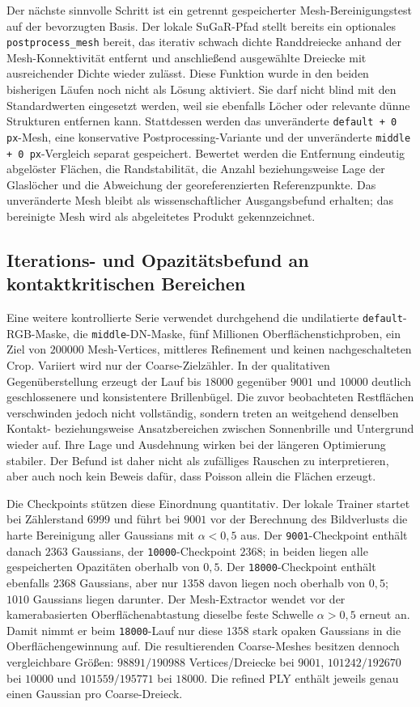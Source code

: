 \documentclass[12pt,a4paper]{article}
\begin{document}
Der nächste sinnvolle Schritt ist ein getrennt gespeicherter Mesh-Bereinigungstest auf der bevorzugten Basis. Der lokale SuGaR-Pfad stellt bereits ein optionales \texttt{postprocess\_mesh} bereit, das iterativ schwach dichte Randdreiecke anhand der Mesh-Konnektivität entfernt und anschließend ausgewählte Dreiecke mit ausreichender Dichte wieder zulässt. Diese Funktion wurde in den beiden bisherigen Läufen noch nicht als Lösung aktiviert. Sie darf nicht blind mit den Standardwerten eingesetzt werden, weil sie ebenfalls Löcher oder relevante dünne Strukturen entfernen kann. Stattdessen werden das unveränderte \texttt{default + 0\,px}-Mesh, eine konservative Postprocessing-Variante und der unveränderte \texttt{middle + 0\,px}-Vergleich separat gespeichert. Bewertet werden die Entfernung eindeutig abgelöster Flächen, die Randstabilität, die Anzahl beziehungsweise Lage der Glaslöcher und die Abweichung der georeferenzierten Referenzpunkte. Das unveränderte Mesh bleibt als wissenschaftlicher Ausgangsbefund erhalten; das bereinigte Mesh wird als abgeleitetes Produkt gekennzeichnet.

\subsection*{Iterations- und Opazitätsbefund an kontaktkritischen Bereichen}

Eine weitere kontrollierte Serie verwendet durchgehend die undilatierte \texttt{default}-RGB-Maske, die \texttt{middle}-DN-Maske, fünf Millionen Oberflächenstichproben, ein Ziel von $200000$ Mesh-Vertices, mittleres Refinement und keinen nachgeschalteten Crop. Variiert wird nur der Coarse-Zielzähler. In der qualitativen Gegenüberstellung erzeugt der Lauf bis $18000$ gegenüber $9001$ und $10000$ deutlich geschlossenere und konsistentere Brillenbügel. Die zuvor beobachteten Restflächen verschwinden jedoch nicht vollständig, sondern treten an weitgehend denselben Kontakt- beziehungsweise Ansatzbereichen zwischen Sonnenbrille und Untergrund wieder auf. Ihre Lage und Ausdehnung wirken bei der längeren Optimierung stabiler. Der Befund ist daher nicht als zufälliges Rauschen zu interpretieren, aber auch noch kein Beweis dafür, dass Poisson allein die Flächen erzeugt.

Die Checkpoints stützen diese Einordnung quantitativ. Der lokale Trainer startet bei Zählerstand $6999$ und führt bei $9001$ vor der Berechnung des Bildverlusts die harte Bereinigung aller Gaussians mit $\alpha<0{,}5$ aus. Der \texttt{9001}-Checkpoint enthält danach $2363$ Gaussians, der \texttt{10000}-Checkpoint $2368$; in beiden liegen alle gespeicherten Opazitäten oberhalb von $0{,}5$. Der \texttt{18000}-Checkpoint enthält ebenfalls $2368$ Gaussians, aber nur $1358$ davon liegen noch oberhalb von $0{,}5$; $1010$ Gaussians liegen darunter. Der Mesh-Extractor wendet vor der kamerabasierten Oberflächenabtastung dieselbe feste Schwelle $\alpha>0{,}5$ erneut an. Damit nimmt er beim \texttt{18000}-Lauf nur diese $1358$ stark opaken Gaussians in die Oberflächengewinnung auf. Die resultierenden Coarse-Meshes besitzen dennoch vergleichbare Größen: $98891/190988$ Vertices/Dreiecke bei $9001$, $101242/192670$ bei $10000$ und $101559/195771$ bei $18000$. Die refined PLY enthält jeweils genau einen Gaussian pro Coarse-Dreieck.
\end{document}
